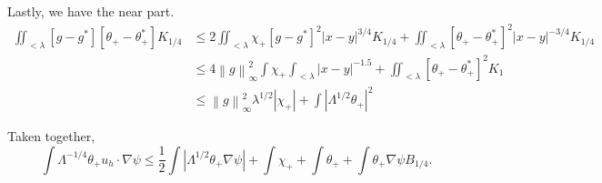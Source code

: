 \documentclass[11pt]{amsart}
\theoremstyle{remark}
\newcommand{\norm}[1]{\left\lVert#1\right\rVert}
\newcommand{\abs}[1]{\left\lvert #1 \right\rvert}
\newcommand{\grad}{\nabla}
\begin{document}
Lastly, we have the near part.  
\begin{align*} 
\iint_{< \lambda} [g-g^*][\theta_+ - \theta_+^*] K_{1/4} &\leq 2\iint_{<\lambda} \chi_+ [g-g^*]^2 |x-y|^{3/4} K_{1/4} + \iint_{<\lambda} [\theta_+-\theta_+^*]^2 |x-y|^{-3/4} K_{1/4} 
\\ &\leq 4 \norm{g}_\infty^2 \int \chi_+ \int_{<\lambda} |x-y|^{-1.5} + \iint_{<\lambda} [\theta_+-\theta_+^*]^2 K_1
\\ &\leq \norm{g}_\infty^2 \lambda^{1/2} \abs{\chi_+} + \int \abs{\Lambda^{1/2} \theta_+}^2
\end{align*}

Taken together,
\[ \int \Lambda^{-1/4} \theta_+ u_h \cdot \grad \psi \leq \frac{1}{2} \int \abs{\Lambda^{1/2} \theta_+ \grad \psi} + \int \chi_+ + \int \theta_+ + \int \theta_+ \grad \psi B_{1/4}. \]
\end{document}
